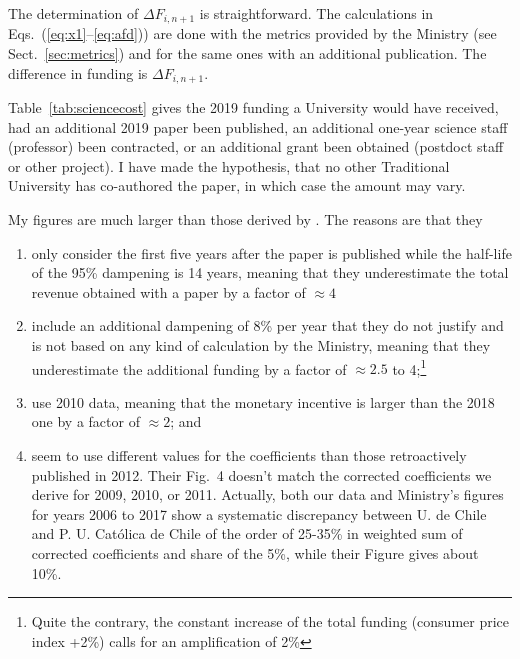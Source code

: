 \documentclass[twocolumn]{article}
\def\eqsref#1#2{Eqs.~(\ref{eq:#1}--\ref{eq:#2})}
\begin{document}
The determination of $\Delta F_{i,n+1}$ is straightforward.  The calculations
in \eqsref{x1}{afd}) are done with the metrics provided by the Ministry (see Sect.~\ref{sec:metrics}) and for the same ones with an additional publication.  The difference in funding is $\Delta F_{i,n+1}$. 

Table~\ref{tab:sciencecost} gives the 2019 funding a University would have received, had an additional 2019 paper been published, an additional one-year science staff (professor) been contracted, or an additional grant been obtained (postdoct staff or other project).  I have made the hypothesis, that no other Traditional University has co-authored the paper, in which case the amount may vary. 

My figures are much larger than those derived by \citet{RAM12}.  The reasons are that they
\begin{enumerate}
\item only consider the first five years after the paper is published while the half-life of the 95\% dampening is 14 years, meaning that they underestimate the total revenue obtained with a paper by a factor of $\approx 4$
\item include an additional dampening of 8\% per year that they do not justify and is not based on any kind of calculation by the Ministry, meaning that they underestimate the additional funding by a factor of $\approx 2.5$ to 4;\footnote{Quite the contrary, the constant increase of the total funding (consumer price index +2\%) calls for an amplification of 2\%}
\item use 2010 data, meaning that the monetary incentive is larger than the 2018 one by a factor of $\approx 2$; and
\item seem to use different values for the coefficients than those retroactively published in 2012. Their Fig.~4 doesn't match the corrected coefficients we derive for 2009, 2010, or 2011. Actually, both our data and Ministry's figures for years 2006 to 2017 show a systematic discrepancy between U. de Chile and P. U. Católica de Chile of the order of 25-35\%  in weighted sum of corrected coefficients and share of the 5\%, while their Figure gives about 10\%.
\end{enumerate}

\appendix
\end{document}
